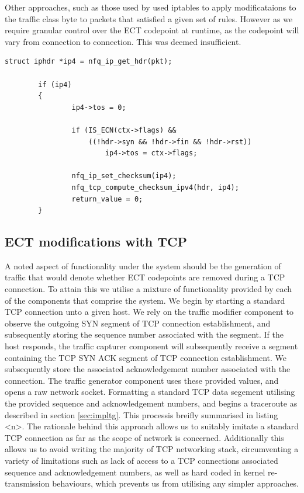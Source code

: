 \documentclass{l4proj}
\begin{document}
Other approaches, such as those used by \cite{bauer_measuring_2011} used iptables to apply modificataions to the traffic class byte to packets that satisfied a given set of rules. However as we require granular control over the ECT codepoint at runtime, as the codepoint will vary from connection to connection. This was deemed insufficient.

\begin{lstlisting}[caption={A demonstration of userspace modification of the traffic class byte on packets queued by the operating system kernel for transmission on the network.}]
struct iphdr *ip4 = nfq_ip_get_hdr(pkt);

        if (ip4)
        {
                ip4->tos = 0;

                if (IS_ECN(ctx->flags) && 
                    ((!hdr->syn && !hdr->fin && !hdr->rst))
                        ip4->tos = ctx->flags;

                nfq_ip_set_checksum(ip4);
                nfq_tcp_compute_checksum_ipv4(hdr, ip4);
                return_value = 0;
        }
\end{lstlisting}
\label{lst:libnf}


\subsection{ECT modifications with TCP}

A noted aspect of functionality under the system should be the generation of traffic that would denote whether ECT codepoints are removed during a TCP connection. To attain this we utilise a mixture of functionality provided by each of the components that comprise the system. We begin by starting a standard TCP connection unto a given host. We rely on the traffic modifier component to observe the outgoing SYN segment of TCP connection establishment, and subsequently storing the sequence number associated with the segment. If the host responds, the traffic capturer component will subsequently receive a segment containing the TCP SYN ACK segment of TCP connection establishment. We subsequently store the associated acknowledgement number associated with the connection. The traffic generator component uses these provided values, and opens a raw network socket. Formatting a standard TCP data segement utilising the provided sequence and acknowledgement numbers, and begins a traceroute as described in section \ref{sec:impltg}. This processis breifly summarised in listing <n>. The rationale behind this approach allows us to suitably imitate a standard TCP connection as far as the scope of network is concerned. Additionally this allows us to avoid writing the majority of TCP networking stack, circumventing a variety of limitations such as lack of access to a TCP connections associated sequence and acknowledgement numbers, as well as hard coded in kernel re-transmission behaviours, which prevents us from utilising any simpler approaches.
\end{document}
